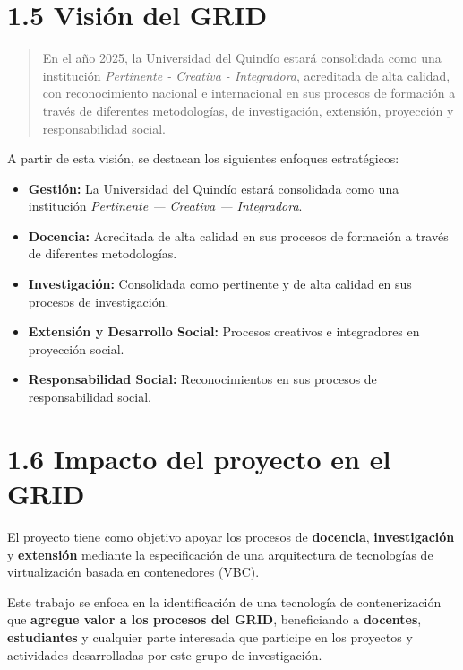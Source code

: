 \section*{1.5 Visión del GRID}

\begin{quote}
En el año 2025, la Universidad del Quindío estará consolidada como una institución \textit{Pertinente - Creativa - Integradora}, acreditada de alta calidad, con reconocimiento nacional e internacional en sus procesos de formación a través de diferentes metodologías, de investigación, extensión, proyección y responsabilidad social.
\end{quote}

A partir de esta visión, se destacan los siguientes enfoques estratégicos:

\begin{itemize}
    \item \textbf{Gestión:} La Universidad del Quindío estará consolidada como una institución \textit{Pertinente --- Creativa --- Integradora}.

    \item \textbf{Docencia:} Acreditada de alta calidad en sus procesos de formación a través de diferentes metodologías.

    \item \textbf{Investigación:} Consolidada como pertinente y de alta calidad en sus procesos de investigación.

    \item \textbf{Extensión y Desarrollo Social:} Procesos creativos e integradores en proyección social.

    \item \textbf{Responsabilidad Social:} Reconocimientos en sus procesos de responsabilidad social.
\end{itemize}

\section*{1.6 Impacto del proyecto en el GRID}

El proyecto tiene como objetivo apoyar los procesos de \textbf{docencia}, \textbf{investigación} 
y \textbf{extensión} mediante la especificación de una arquitectura de tecnologías de 
virtualización basada en contenedores (VBC). 

Este trabajo se enfoca en la identificación de una tecnología de contenerización que 
\textbf{agregue valor a los procesos del GRID}, beneficiando a \textbf{docentes}, \textbf{estudiantes} 
y cualquier parte interesada que participe en los proyectos y actividades desarrolladas 
por este grupo de investigación.


